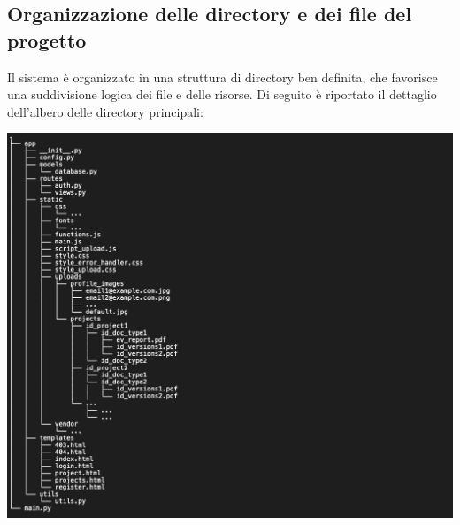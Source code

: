 \documentclass{report}
\begin{document}
\subsection{Organizzazione delle directory e dei file del progetto}
Il  sistema è organizzato in una struttura di directory ben definita, che favorisce una suddivisione logica dei file e delle risorse. Di seguito è riportato il dettaglio dell'albero delle directory principali:
\begin{center}
\includegraphics[scale = 0.5]{5.png}
\end{center}
\end{document}
